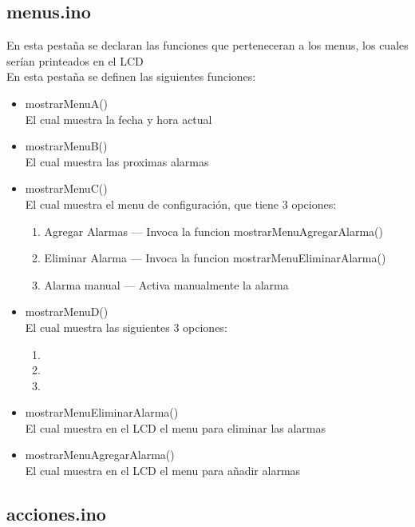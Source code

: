 \documentclass{article}
\begin{document}
	\subsection{menus.ino}
	En esta pestaña se declaran las funciones que perteneceran a los menus, 
	los cuales serían printeados en el LCD\\
	En esta pestaña se definen las siguientes funciones:
	\begin{itemize}
		\item mostrarMenuA() \\
		El cual muestra la fecha y hora actual
		\item mostrarMenuB() \\
		El cual muestra las proximas alarmas
		\item mostrarMenuC() \\
		El cual muestra el menu de configuración, que tiene 3 opciones:
			\begin{enumerate}
				\item Agregar Alarmas --- Invoca la funcion mostrarMenuAgregarAlarma() 
				\item Eliminar Alarma --- Invoca la funcion mostrarMenuEliminarAlarma() 
				\item Alarma manual --- Activa manualmente la alarma
			\end{enumerate}
		\item mostrarMenuD() \\
		El cual muestra las siguientes 3 opciones: 
			\begin{enumerate}
				\item
				\item
				\item
			\end{enumerate}
		\item mostrarMenuEliminarAlarma() \\
		El cual muestra en el LCD el menu para eliminar las alarmas
		\item mostrarMenuAgregarAlarma() \\
		El cual muestra en el LCD el menu para añadir alarmas
	\end{itemize}
 
	\clearpage
	\subsection{acciones.ino}
 
\end{document}
